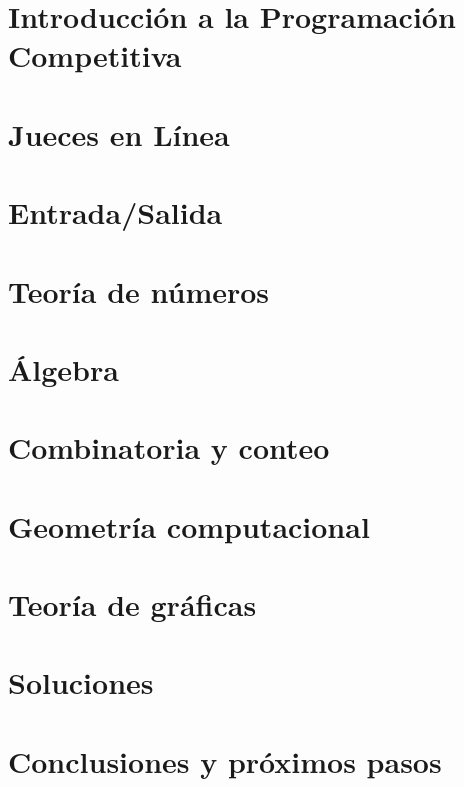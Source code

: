 \documentclass[11pt,openany]{book}
\theoremstyle{definition}
\theoremstyle{plain}
\theoremstyle{remark}
\begin{document}




\begingroup
\let\cleardoublepage\clearpage
\tableofcontents
\endgroup



\chapter{Introducción a la Programación Competitiva}


\chapter{Jueces en Línea}


\chapter{Entrada/Salida}


\chapter{Teoría de números}\label{chap:numeros}


\chapter{Álgebra}


\chapter{Combinatoria y conteo}


\chapter{Geometría computacional}


\chapter{Teoría de gráficas}


\chapter{\hspace{.3em} Soluciones}


\chapter{\hspace{.3em} Conclusiones y próximos pasos}


\newpage
%


\end{document}
